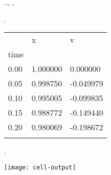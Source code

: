   \begin{figure*}[t]
    \begin{minipage}[t]{\linewidth}
      \begin{CodeInput}
      \begin{Highlighting}[]
         
         
      
       \OperatorTok{=} 
       \OperatorTok{=} .\KeywordTok{(}\OperatorTok{=}.\KeywordTok{(}, , \KeywordTok{))}
      \end{Highlighting}
      \end{CodeInput}
    \end{minipage}%
    \newline
    \begin{minipage}[t]{0.45\linewidth}
      \begin{CodeInput}
      \begin{Highlighting}[]
      .\KeywordTok{()}
      \end{Highlighting}
      \end{CodeInput}
      \begin{CodeOutput}
          \begin{tabular}[]{@{}lll@{}}
              \toprule
              & x & v \\
              time & & \\
              \midrule
              0.00 & 1.000000 & 0.000000 \\
              0.05 & 0.998750 & -0.049979 \\
              0.10 & 0.995005 & -0.099835 \\
              0.15 & 0.988772 & -0.149440 \\
              0.20 & 0.980069 & -0.198672 \\
              \botrule
          \end{tabular}
      \end{CodeOutput}
    \end{minipage}%
    \hfill
    \begin{minipage}[t]{0.45\linewidth}
      \begin{CodeInput}
      \begin{Highlighting}[]
      .\KeywordTok{()}\OperatorTok{;}
      \end{Highlighting}
      \end{CodeInput}
      \begin{CodeOutput}
        \texttt{[image: cell-output]}
      \end{CodeOutput}
    \end{minipage}%
    

\end{figure*}
